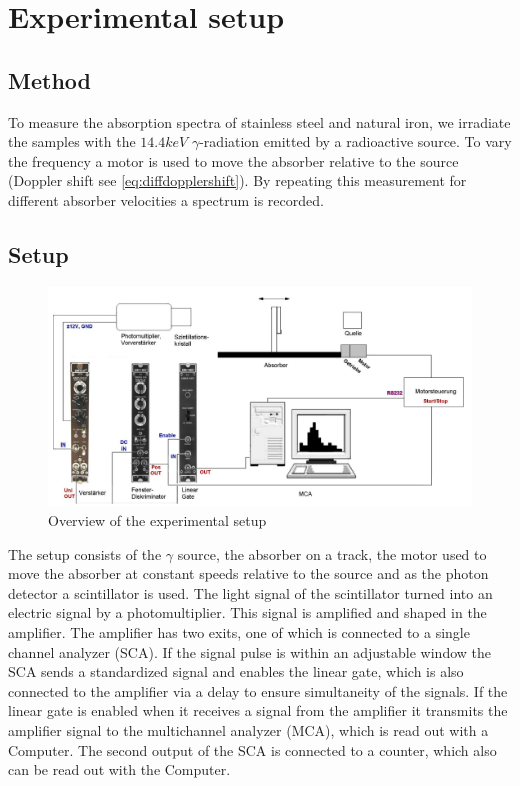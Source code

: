 \section{Experimental setup}
\subsection{Method}
To measure the absorption spectra of stainless steel and natural iron, we irradiate the samples with the $14.4keV$ $\gamma$-radiation emitted by a radioactive source. To vary the frequency a motor is used to move the absorber relative to the source (Doppler shift see  \ref{eq:diffdopplershift}). By repeating this measurement for different absorber velocities a spectrum is recorded.\\
\subsection{Setup}
\begin{figure}[hbt]
\centering
\includegraphics[width=1.0\linewidth]{graphics/Aufbau}
\caption[Setup overview ]{Overview of the experimental setup}
\label{fig:Aufbau}
\end{figure}

The setup consists of the $\gamma$ source, the absorber on a track, the motor used to move the absorber at constant speeds relative to the source and as the photon detector a scintillator is used. The light signal of the scintillator turned into an electric signal by a photomultiplier. This signal is amplified and shaped in the amplifier. The amplifier has two exits, one of which is connected to a single channel analyzer (SCA). If the signal pulse is within an adjustable window the SCA sends a standardized signal and enables the linear gate, which is also connected to the amplifier via a delay to ensure simultaneity of the signals. If the linear gate is enabled when it receives a signal from the amplifier it transmits the amplifier signal to the multichannel analyzer (MCA), which is read out with a Computer. The second output of the SCA is connected to a counter, which also can be read out with the Computer.

